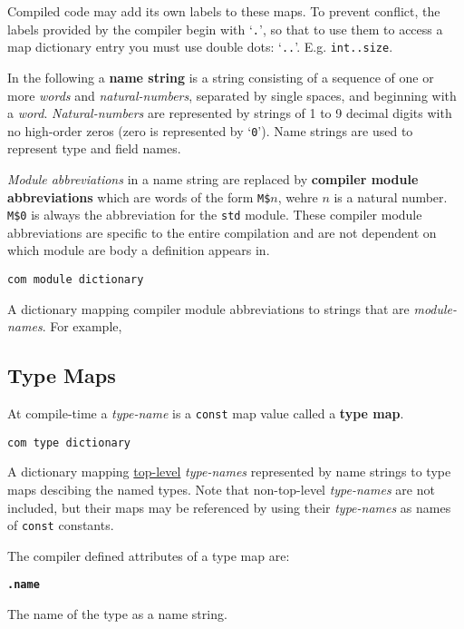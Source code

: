 \documentclass[12pt]{article}
\newcommand{\key}[1]{{\rm \bfseries #1}}
\newcommand{\ttkey}[1]{{\tt \bfseries #1}}
\newenvironment{indpar}[1][0.3in]%
	{\begin{list}{}%
		     {\setlength{\itemsep}{0in}%
		      \setlength{\topsep}{0in}%
		      \setlength{\parsep}{1ex}%
		      \setlength{\labelwidth}{#1}%
		      \setlength{\leftmargin}{#1}%
		      \addtolength{\leftmargin}{\labelsep}}%
	 \item}%
	{\end{list}}
\begin{document}
Compiled code may add its own labels to these maps.
To prevent conflict, the labels provided by the compiler
begin with `{\tt .}', so
that to use them to access a map dictionary entry
you must use double dots: `{\tt ..}'.
E.g. {\tt int..size}.

In the following a \key{name string} is a string
consisting of a sequence of one or more {\em words}
and {\em natural-numbers}, separated
by single spaces, and beginning with a {\em word}.
{\em Natural-numbers} are represented
by strings of 1 to 9 decimal digits with no high-order
zeros (zero is represented by `{\tt 0}').
Name strings are used to represent type and field
names.

{\em Module abbreviations} in a name string are
replaced by \key{compiler module abbreviations}
which are words of the form {\tt M\$$n$}, wehre
$n$ is a natural number.  {\tt M\$0} is always
the abbreviation for the {\tt std} module.
These compiler module abbreviations are specific to the
entire compilation and are not dependent on which
module are body a definition appears in.

{\tt com module dictionary}
\begin{indpar}
A dictionary mapping compiler module abbreviations
to strings that are {\em module-names}.  For example,
\\
\hspace*{1.5in}{\tt com module dictionary["M\$0"] == "standard"}
\end{indpar}

\subsection{Type Maps}
\label{TYPE-MAPS}

At compile-time a {\em type-name} is a {\tt const} map value
called a \key{type map}.

{\tt com type dictionary}
\begin{indpar}
A dictionary mapping \underline{top-level} {\em type-names}
represented by name strings to type maps descibing the
named types.  Note that non-top-level {\em type-names}
are not included, but their maps may be referenced by using
their {\em type-names} as names of {\tt const} constants.
\end{indpar}

The compiler defined attributes of a type map are:

\ttkey{.name}
\begin{indpar}
The name of the type as a name string.
\end{indpar}
\end{document}
